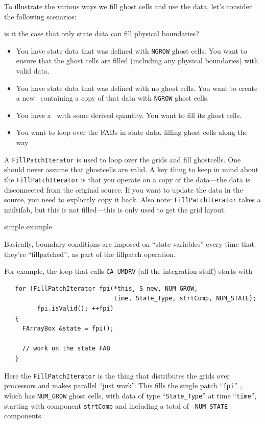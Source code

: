 To illustrate the various ways we fill ghost cells and use the data,
let's consider the following scenarios:

is it the case that only state data can fill physical boundaries?

\begin{itemize}



\item You have state data that was defined with {\tt NGROW} ghost
  cells.  You want to ensure that the ghost cells are filled
  (including any physical boundaries) with valid data.

\item You have state data that was defined with no ghost cells.  You
  want to create a new \multifab\ containing a copy of that data with
  {\tt NGROW} ghost cells.

\item You have a \multifab\ with some derived quantity.  You want to
  fill its ghost cells.

\item You want to loop over the FABs in state data, filling ghost cells
  along the way

\end{itemize}

A {\tt FillPatchIterator} is used to loop over the grids and fill
ghostcells.  One should never assume that ghostcells are valid.  A key
thing to keep in mind about the {\tt FillPatchIterator} is that you
operate on a copy of the data---the data is disconnected from the
original source.  If you want to update the data in the source,
you need to explicitly copy it back.  Also note: {\tt FillPatchIterator}
takes a multifab, but this is not filled---this is only used to
get the grid layout.  

{\color{red}simple example}

Basically, boundary conditions are imposed on ``state variables'' every
time that they're ``fillpatched'', as part of the fillpatch operation.

For example, the loop that calls {\tt CA\_UMDRV} (all the integration stuff) starts with
\begin{lstlisting}
   for (FillPatchIterator fpi(*this, S_new, NUM_GROW,
                              time, State_Type, strtComp, NUM_STATE);
         fpi.isValid(); ++fpi)
   {
     FArrayBox &state = fpi();

     // work on the state FAB
   }
\end{lstlisting}
Here the {\tt FillPatchIterator} is the thing that distributes the
grids over processors and makes parallel ``just work''. This fills the
single patch ``{\tt fpi}'' , which has {\tt NUM\_GROW} ghost cells,
with data of type ``{\tt State\_Type}'' at time ``{\tt time}'',
starting with component {\tt strtComp} and including a total of {\tt
  NUM\_STATE} components.

